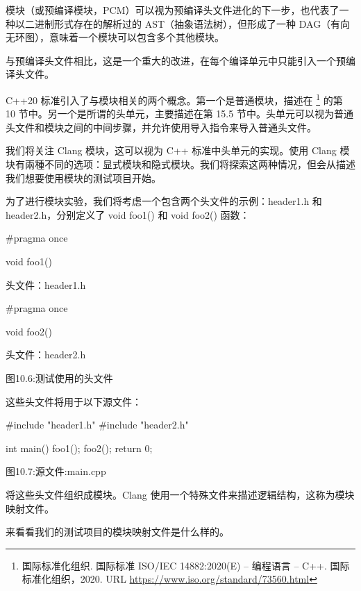 模块（或预编译模块，PCM）可以视为预编译头文件进化的下一步，也代表了一种以二进制形式存在的解析过的 AST（抽象语法树），但形成了一种 DAG（有向无环图），意味着一个模块可以包含多个其他模块。

与预编译头文件相比，这是一个重大的改进，在每个编译单元中只能引入一个预编译头文件。

C++20 标准引入了与模块相关的两个概念。第一个是普通模块，描述在 \footnote{国际标准化组织. 国际标准 ISO/IEC 14882:2020(E) – 编程语言 – C++. 国际标准化组织，2020. URL \url{https://www.iso.org/standard/73560.html}} 的第 10 节中。另一个是所谓的头单元，主要描述在第 15.5 节中。头单元可以视为普通头文件和模块之间的中间步骤，并允许使用导入指令来导入普通头文件。

我们将关注 Clang 模块，这可以视为 C++ 标准中头单元的实现。使用 Clang 模块有兩種不同的选项：显式模块和隐式模块。我们将探索这两种情况，但会从描述我们想要使用模块的测试项目开始。


为了进行模块实验，我们将考虑一个包含两个头文件的示例：header1.h 和 header2.h，分别定义了 void foo1() 和 void foo2() 函数：

\begin{cpp}
#pragma once

void foo1() {}
\end{cpp}

头文件：header1.h

\begin{cpp}
#pragma once

void foo2() {}
\end{cpp}

头文件：header2.h

\begin{center}
图10.6:测试使用的头文件
\end{center}

这些头文件将用于以下源文件：

\begin{cpp}
#include "header1.h"
#include "header2.h"

int main() {
  foo1();
  foo2();
  return 0;
}
\end{cpp}

\begin{center}
图10.7:源文件:main.cpp
\end{center}

将这些头文件组织成模块。Clang 使用一个特殊文件来描述逻辑结构，这称为模块映射文件。

来看看我们的测试项目的模块映射文件是什么样的。

